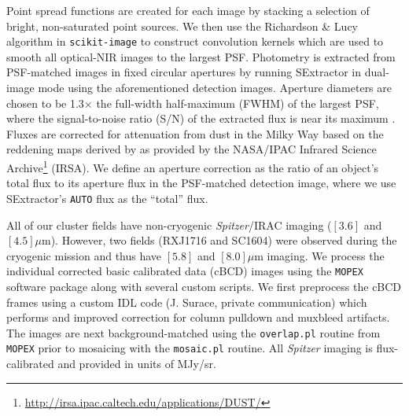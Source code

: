 \documentclass[a4paper,fleqn,usenatbib]{mnras}
\begin{document}
Point spread functions are created for each image by stacking a selection of bright, non-saturated point sources.
We then use the Richardson \& Lucy algorithm in {\tt scikit-image} \citep{vanderWalt2014arxiv} to construct convolution kernels which are used to smooth all optical-NIR images to the largest PSF.
Photometry is extracted from PSF-matched images in fixed circular apertures by running SExtractor in dual-image mode using the aforementioned detection images.
Aperture diameters are chosen to be 1.3$\times$ the full-width half-maximum (FWHM) of the largest PSF, where the signal-to-noise ratio (S/N) of the extracted flux is near its maximum \citep[see Section 4.1 of][]{Whitaker2011}.
Fluxes are corrected for attenuation from dust in the Milky Way based on the reddening maps derived by \citet{Schlafly2011} as provided by the NASA/IPAC Infrared Science Archive\footnote{\url{http://irsa.ipac.caltech.edu/applications/DUST/}} (IRSA).
We define an aperture correction as the ratio of an object's total flux to its aperture flux in the PSF-matched detection image, where we use SExtractor's {\tt AUTO} flux as the ``total'' flux.


All of our cluster fields have non-cryogenic {\it Spitzer}/IRAC imaging ($[3.6]$ and $[4.5]\mu$m).
However, two fields (RXJ1716 and SC1604) were observed during the cryogenic mission and thus have $[5.8]$ and $[8.0]\mu$m imaging.
We process the individual corrected basic calibrated data (cBCD) images using the {\tt MOPEX} software package \citep{Makovoz2006} along with several custom scripts.
We first preprocess the cBCD frames using a custom IDL code (J. Surace, private communication) which performs and improved correction for column pulldown and muxbleed artifacts.
The images are next background-matched using the {\tt overlap.pl} routine from {\tt MOPEX} prior to mosaicing with the {\tt mosaic.pl} routine.
All {\it Spitzer} imaging is flux-calibrated and provided in units of MJy/sr.




\end{document}
